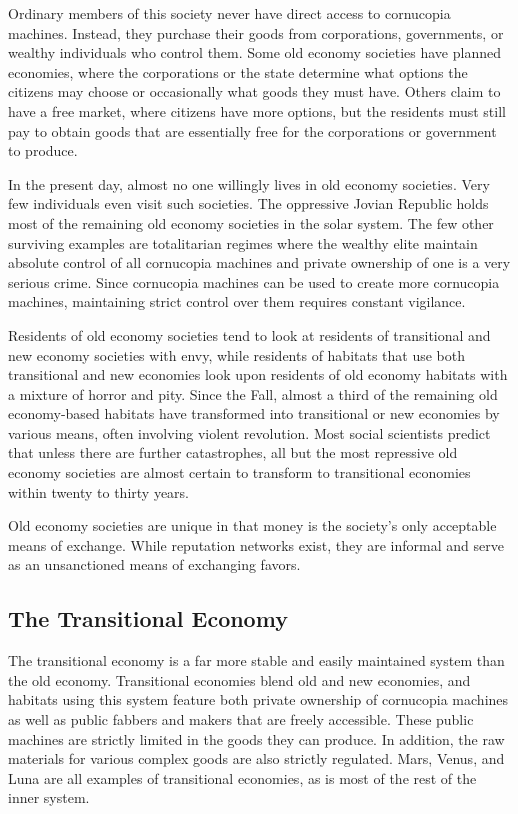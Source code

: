 Ordinary members of this society never have direct 
access to cornucopia machines. Instead, they purchase
their goods from corporations, governments,
or wealthy individuals who control them. Some old 
economy societies have planned economies, where the 
corporations or the state determine what options the 
citizens may choose or occasionally what goods they 
must have. Others claim to have a free market, where 
citizens have more options, but the residents must still 
pay to obtain goods that are essentially free for the 
corporations or government to produce.

In the present day, almost no one willingly lives in 
old economy societies. Very few individuals even visit 
such societies. The oppressive Jovian Republic holds 
most of the remaining old economy societies in the 
solar system. The few other surviving examples are 
totalitarian regimes where the wealthy elite maintain 
absolute control of all cornucopia machines and private
ownership of one is a very serious crime. Since
cornucopia machines can be used to create more 
cornucopia machines, maintaining strict control over 
them requires constant vigilance.

Residents of old economy societies tend to look at 
residents of transitional and new economy societies 
with envy, while residents of habitats that use both 
transitional and new economies look upon residents 
of old economy habitats with a mixture of horror and 
pity. Since the Fall, almost a third of the remaining 
old economy-based habitats have transformed into 
transitional or new economies by various means, 
often involving violent revolution. Most social scientists
predict that unless there are further catastrophes,
all but the most repressive old economy societies are 
almost certain to transform to transitional economies 
within twenty to thirty years.

Old economy societies are unique in that money is 
the society's only acceptable means of exchange. While 
reputation networks exist, they are informal and serve 
as an unsanctioned means of exchanging favors.

\subsection{The Transitional Economy}

The transitional economy is a far more stable and 
easily maintained system than the old economy. 
Transitional economies blend old and new economies, 
and habitats using this system feature both private 
ownership of cornucopia machines as well as public 
fabbers and makers that are freely accessible. These 
public machines are strictly limited in the goods they 
can produce. In addition, the raw materials for various
complex goods are also strictly regulated. Mars,
Venus, and Luna are all examples of transitional 
economies, as is most of the rest of the inner system.

